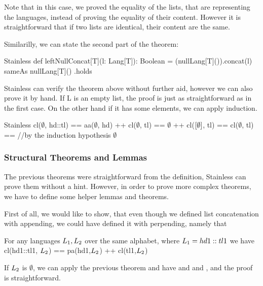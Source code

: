 Note that in this case, we proved the equality of the lists, that are representing the languages, instead of proving the equality of their content. However it is straightforward that if two lists are identical, their content are the same.

Similarilly, we can state the second part of the theorem:

\begin{ShortCode}{Stainless}
 def leftNullConcat[T](l: Lang[T]): Boolean = {
   (nullLang[T]()).concat(l) sameAs nullLang[T]()
 }.holds	
\end{ShortCode}

Stainless can verify the theorem above without further aid, however we can also prove it by hand. If L is an empty list, the proof is just as straightforward as in the first case. On the other hand if it has some elements, we can apply induction.

\begin{ShortCode}{Stainless}
 cl($\emptyset$, hd::tl) ==
 aa($\emptyset$, hd) ++ cl($\emptyset$, tl) ==
 $\emptyset$ ++ cl($[\emptyset]$, tl) ==
 cl($\emptyset$, tl) == //by the induction hypothesis
 $\emptyset$
\end{ShortCode}

\subsubsection{Structural Theorems and Lemmas}

The previous theorems were straightforward from the definition, Stainless can prove them without a hint. However, in order to prove more complex theorems, we have to define some helper lemmas and theorems.

First of all, we would like to show, that even though we defined list concatenation with appending, we could have defined it with perpending, namely that 

\begin{lemma}
	\label{lem:clInductLeft}
	For any languages $L_{1}, L_{2}$ over the same alphabet, where $L_{1} = hd1::tl1$ we have
	cl(hd1::tl1, $ L_{2}$) == pa(hd1,$ L_{2}$) ++ cl(tl1,$ L_{2}$)
\end{lemma}

If $ L_{2}$ is $\emptyset$, we can apply the previous theorem and have  and \inline{ [pa(hd,$\emptyset$)] = $\emptyset$  } and , and the proof is straightforward.

